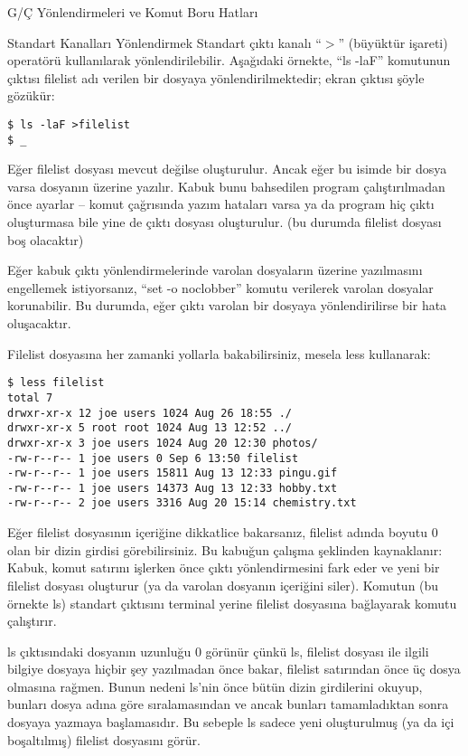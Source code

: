 \begin{section}{G/Ç Yönlendirmeleri ve Komut Boru Hatları}
\begin{subsection}{Standart Kanalları Yönlendirmek}
Standart çıktı kanalı “$>$” (büyüktür işareti) operatörü kullanılarak yönlendirilebilir. Aşağıdaki örnekte, “ls -laF” komutunun çıktısı filelist adı verilen bir  dosyaya yönlendirilmektedir; ekran çıktısı şöyle gözükür:
\begin{verbatim}
$ ls -laF >filelist 
$ _
\end{verbatim}

Eğer filelist dosyası mevcut değilse oluşturulur. Ancak eğer bu isimde bir dosya varsa dosyanın üzerine yazılır. Kabuk bunu bahsedilen program çalıştırılmadan önce ayarlar – komut çağrısında yazım hataları varsa ya da program hiç çıktı oluşturmasa bile yine de çıktı dosyası oluşturulur. (bu durumda filelist dosyası boş olacaktır)

Eğer kabuk çıktı yönlendirmelerinde varolan dosyaların üzerine yazılmasını engellemek istiyorsanız, “set -o noclobber” komutu verilerek varolan dosyalar korunabilir. Bu durumda, eğer çıktı varolan bir dosyaya yönlendirilirse bir hata oluşacaktır.

Filelist dosyasına her zamanki yollarla bakabilirsiniz, mesela less kullanarak:
\begin{verbatim}
$ less filelist
total 7 
drwxr-xr-x 12 joe users 1024 Aug 26 18:55 ./
drwxr-xr-x 5 root root 1024 Aug 13 12:52 ../
drwxr-xr-x 3 joe users 1024 Aug 20 12:30 photos/
-rw-r--r-- 1 joe users 0 Sep 6 13:50 filelist
-rw-r--r-- 1 joe users 15811 Aug 13 12:33 pingu.gif
-rw-r--r-- 1 joe users 14373 Aug 13 12:33 hobby.txt
-rw-r--r-- 2 joe users 3316 Aug 20 15:14 chemistry.txt
\end{verbatim}

Eğer filelist dosyasının içeriğine dikkatlice bakarsanız, filelist adında boyutu 0 olan bir dizin girdisi görebilirsiniz. Bu kabuğun çalışma şeklinden kaynaklanır: Kabuk, komut satırını işlerken önce çıktı yönlendirmesini fark eder ve yeni bir filelist dosyası oluşturur (ya da varolan dosyanın içeriğini siler). Komutun (bu örnekte ls) standart çıktısını terminal yerine filelist dosyasına bağlayarak komutu çalıştırır.

ls çıktısındaki dosyanın uzunluğu 0 görünür çünkü ls, filelist dosyası ile ilgili bilgiye dosyaya hiçbir şey yazılmadan önce bakar, filelist satırından önce üç dosya olmasına rağmen. Bunun nedeni ls'nin önce bütün dizin girdilerini okuyup, bunları dosya adına göre sıralamasından ve ancak bunları tamamladıktan sonra dosyaya yazmaya başlamasıdır. Bu sebeple ls sadece yeni oluşturulmuş (ya da içi boşaltılmış) filelist dosyasını görür.


\end{subsection}
\end{section}
